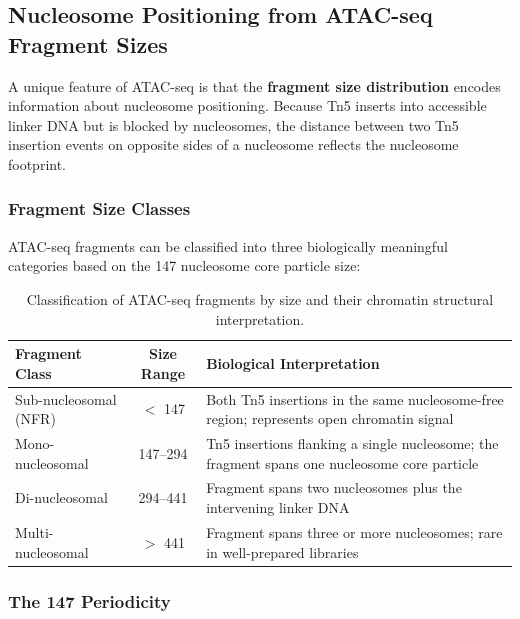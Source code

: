 \subsection{Nucleosome Positioning from ATAC-seq Fragment Sizes}
\label{subsec:chromatin:nucleosome-positioning}

A unique feature of ATAC-seq is that the \textbf{fragment size distribution} encodes information about nucleosome positioning. Because Tn5 inserts into accessible linker DNA but is blocked by nucleosomes, the distance between two Tn5 insertion events on opposite sides of a nucleosome reflects the nucleosome footprint.

\subsubsection{Fragment Size Classes}

ATAC-seq fragments can be classified into three biologically meaningful categories based on the 147\basepair{} nucleosome core particle size:

\begin{table}[htbp]
\centering
\caption[ATAC-seq fragment size classes and their biological interpretation.]{Classification of ATAC-seq fragments by size and their chromatin structural interpretation.}
\label{tab:chromatin:fragment-classes}
\small
\begin{tabularx}{\textwidth}{l c X}
\toprule
\textbf{Fragment Class} & \textbf{Size Range} & \textbf{Biological Interpretation} \\
\midrule
Sub-nucleosomal (NFR) & $<$ 147\basepair{} & Both Tn5 insertions in the same nucleosome-free region; represents open chromatin signal \\
\addlinespace
Mono-nucleosomal & 147--294\basepair{} & Tn5 insertions flanking a single nucleosome; the fragment spans one nucleosome core particle \\
\addlinespace
Di-nucleosomal & 294--441\basepair{} & Fragment spans two nucleosomes plus the intervening linker DNA \\
\addlinespace
Multi-nucleosomal & $>$ 441\basepair{} & Fragment spans three or more nucleosomes; rare in well-prepared libraries \\
\bottomrule
\end{tabularx}
\end{table}

\subsubsection{The 147\basepair{} Periodicity}

